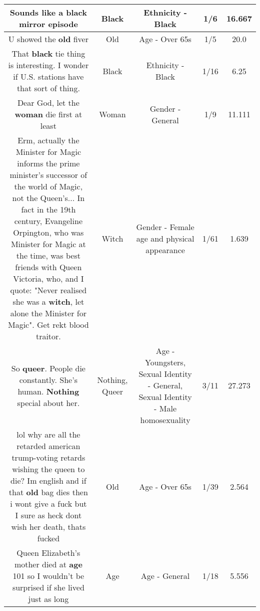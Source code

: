 \documentclass[11pt]{article}
\newlength\mylength
\begin{document}
\begin{center}
\begin{longtable}{|C{.65\mylength}|C{.30\mylength}|C{.12\mylength}|C{.12\mylength}|C{.12\mylength}|}
  \small Sounds like a \textbf{black} mirror episode\normalsize   & Black & Ethnicity - Black & 1/6 & 16.667 \\  \hline
  \small U showed the \textbf{old} fiver\normalsize   & Old & Age - Over 65s & 1/5 & 20.0 \\  \hline
  \small That \textbf{black} tie thing is interesting. I wonder if U.S. stations have that sort of thing.\normalsize   & Black & Ethnicity - Black & 1/16 & 6.25 \\  \hline
  \small Dear God, let the \textbf{woman} die first at least\normalsize   & Woman & Gender - General & 1/9 & 11.111 \\  \hline
  \small Erm, actually the Minister for Magic informs the prime minister's successor of the world of Magic, not the Queen's... In fact in the 19th century, Evangeline Orpington, who was Minister for Magic at the time, was best friends with Queen Victoria, who, and I quote: "Never realised she was a \textbf{witch}, let alone the Minister for Magic". Get rekt blood traitor.\normalsize   & Witch & Gender - Female age and physical appearance & 1/61 & 1.639 \\  \hline
  \small So \textbf{q\textbf{ueer}}. People die constantly. She's human. \textbf{Nothing} special about her.\normalsize   & Nothing, Queer & Age - Youngsters, Sexual Identity - General, Sexual Identity - Male homosexuality & 3/11 & 27.273 \\  \hline
  \small lol why are all the retarded american trump-voting retards wishing the queen to die? Im english and if that \textbf{old} bag dies then i wont give a fuck but I sure as heck dont wish her death, thats fucked\normalsize   & Old & Age - Over 65s & 1/39 & 2.564 \\  \hline
  \small Queen Elizabeth's mother died at \textbf{age} 101 so I wouldn't be surprised if she lived just as long\normalsize   & Age & Age - General & 1/18 & 5.556 \\  \hline

\end{longtable}
\end{center}
\end{document}
